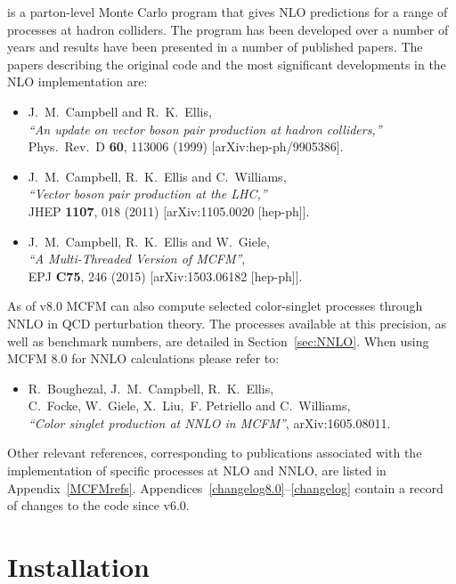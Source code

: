 \documentclass[12pt]{article}
\begin{document}
\MCFM is a parton-level Monte Carlo program that gives NLO predictions
for a range of processes at hadron colliders. The program has been
developed over a number of years and results have been presented in
a number of published papers.  The papers describing the original
code and the most significant developments in the NLO implementation are:
\begin{itemize}
\item J.~M.~Campbell and R.~K.~Ellis, \\
  {\it ``An update on vector boson pair production at hadron colliders,''} \\
  Phys.\ Rev.\ D {\bf 60}, 113006 (1999)
  [arXiv:hep-ph/9905386].
\item J.~M.~Campbell, R.~K.~Ellis and C.~Williams, \\
  {\it ``Vector boson pair production at the LHC,''} \\
  JHEP {\bf 1107}, 018 (2011)
  [arXiv:1105.0020 [hep-ph]]. 
\item J.~M.~Campbell, R.~K.~Ellis and W.~Giele, \\
  {\it ``A Multi-Threaded Version of MCFM''}, \\
    EPJ {\bf C75}, 246 (2015)
    [arXiv:1503.06182 [hep-ph]].
\end{itemize}
 
As of v8.0 MCFM can also compute selected color-singlet processes through NNLO in QCD
perturbation theory.  The processes available at this precision, as well as
benchmark numbers, are detailed in Section~\ref{sec:NNLO}.  When using MCFM 8.0
for NNLO calculations please refer to:
\begin{itemize}
\item 
  R.~Boughezal, J.~M.~Campbell, R.~K.~Ellis, \\
   C.~Focke, W.~Giele, X.~Liu,~F. Petriello and  C.~Williams, \\
  {\it ``Color singlet production at NNLO in MCFM''},
  arXiv:1605.08011.
\end{itemize}

Other relevant references, corresponding to publications associated with the
implementation of specific processes at NLO and NNLO, are listed
in Appendix~\ref{MCFMrefs}.  Appendices~\ref{changelog8.0}--\ref{changelog} contain
a record of changes to the code since v6.0.

\section{Installation}
\end{document}
